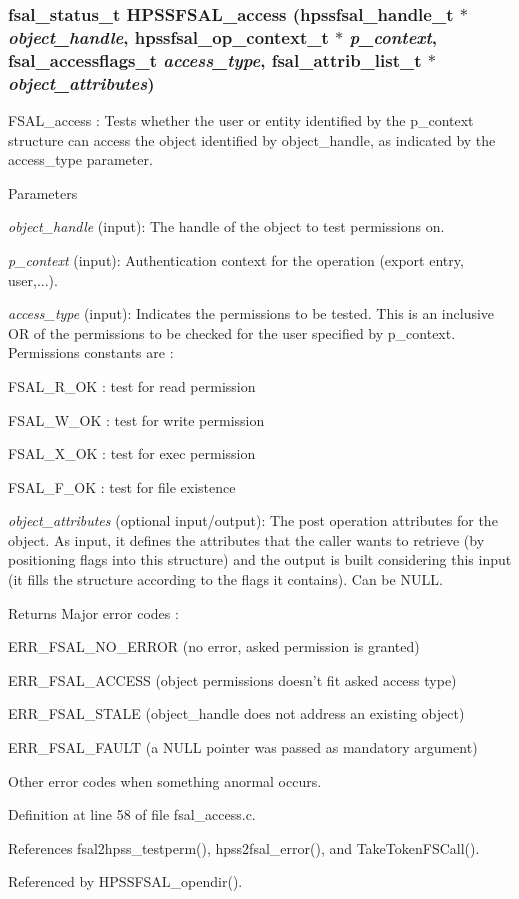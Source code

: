 \subsubsection[{HPSSFSAL\_\-access}]{\setlength{\rightskip}{0pt plus 5cm}fsal\_\-status\_\-t HPSSFSAL\_\-access (hpssfsal\_\-handle\_\-t $\ast$ {\em object\_\-handle}, \/  hpssfsal\_\-op\_\-context\_\-t $\ast$ {\em p\_\-context}, \/  fsal\_\-accessflags\_\-t {\em access\_\-type}, \/  fsal\_\-attrib\_\-list\_\-t $\ast$ {\em object\_\-attributes})}\label{fsal__access_8c_abb1997b32c5cca60ba37f496da9a0621}
FSAL\_\-access : Tests whether the user or entity identified by the p\_\-context structure can access the object identified by object\_\-handle, as indicated by the access\_\-type parameter.


\begin{DoxyParams}{Parameters}
\item[{\em object\_\-handle}](input): The handle of the object to test permissions on. \item[{\em p\_\-context}](input): Authentication context for the operation (export entry, user,...). \item[{\em access\_\-type}](input): Indicates the permissions to be tested. This is an inclusive OR of the permissions to be checked for the user specified by p\_\-context. Permissions constants are :
\begin{DoxyItemize}
\item FSAL\_\-R\_\-OK : test for read permission
\item FSAL\_\-W\_\-OK : test for write permission
\item FSAL\_\-X\_\-OK : test for exec permission
\item FSAL\_\-F\_\-OK : test for file existence 
\end{DoxyItemize}\item[{\em object\_\-attributes}](optional input/output): The post operation attributes for the object. As input, it defines the attributes that the caller wants to retrieve (by positioning flags into this structure) and the output is built considering this input (it fills the structure according to the flags it contains). Can be NULL.\end{DoxyParams}
\begin{DoxyReturn}{Returns}
Major error codes :
\begin{DoxyItemize}
\item ERR\_\-FSAL\_\-NO\_\-ERROR (no error, asked permission is granted)
\item ERR\_\-FSAL\_\-ACCESS (object permissions doesn't fit asked access type)
\item ERR\_\-FSAL\_\-STALE (object\_\-handle does not address an existing object)
\item ERR\_\-FSAL\_\-FAULT (a NULL pointer was passed as mandatory argument)
\item Other error codes when something anormal occurs. 
\end{DoxyItemize}
\end{DoxyReturn}


Definition at line 58 of file fsal\_\-access.c.

References fsal2hpss\_\-testperm(), hpss2fsal\_\-error(), and TakeTokenFSCall().

Referenced by HPSSFSAL\_\-opendir().